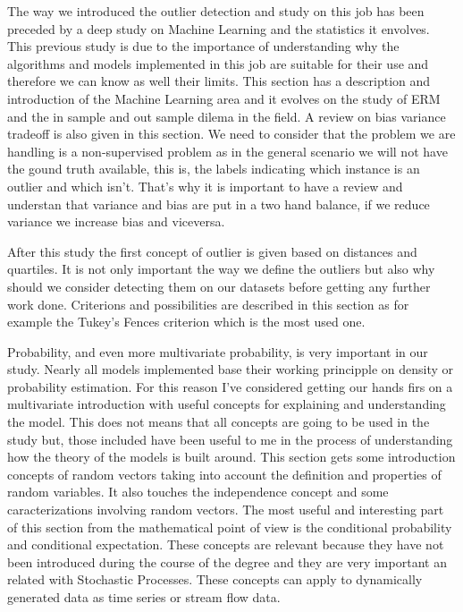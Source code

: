 The way we introduced the outlier detection and study on this job has been preceded by a deep study on Machine Learning and the statistics it envolves. This previous study is due to the importance of understanding why the algorithms and models implemented in this job are suitable for their use and therefore we can know as well their limits. This section has a description and introduction of the Machine Learning area and it evolves on the study of ERM and the in sample and out sample dilema in the field. A review on bias variance tradeoff is also given in this section. We need to consider that the problem we are handling is a non-supervised problem as in the general scenario we will not have the gound truth available, this is, the labels indicating which instance is an outlier and which isn't. That's why it is important to have a review and understan that variance and bias are put in a two hand balance, if we reduce variance we increase bias and viceversa.

After this study the first concept of outlier is given based on distances and quartiles. It is not only important the way we define the outliers but also why should we consider detecting them on our datasets before getting any further work done. Criterions and possibilities are described in this section as for example the Tukey's Fences criterion which is the most used one.

Probability, and even more multivariate probability, is very important in our study. Nearly all models implemented base their working principple on density or probability estimation. For this reason I've considered getting our hands firs on a multivariate introduction with useful concepts for explaining and understanding the model. This does not means that all concepts are going to be used in the study but, those included have been useful to me in the process of understanding how the theory of the models is built around. This section gets some introduction concepts of random vectors taking into account the definition and properties of random variables. It also touches the independence concept and some caracterizations involving random vectors. The most useful and interesting part of this section from the mathematical point of view is the conditional probability and conditional expectation. These concepts are relevant because they have not been introduced during the course of the degree and they are very important an related with Stochastic Processes. These concepts can apply to dynamically generated data as time series or stream flow data.

